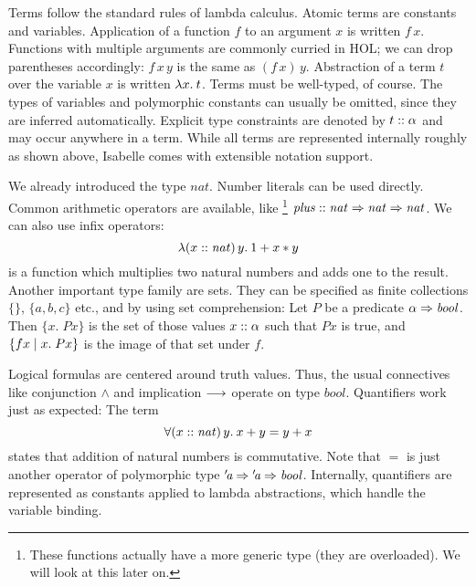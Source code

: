 Terms follow the standard rules of lambda calculus.
Atomic terms are constants and variables.
Application of a function $f$ to an argument $x$ is written $f\,x$.
Functions with multiple arguments are commonly curried in HOL;
we can drop parentheses accordingly: $f\,x\,y$ is the same as $(f\,x)\,y$.
Abstraction of a term $t$ over the variable $x$ is written $\lambda x.\>t$.
Terms must be well-typed, of course.
The types of variables and polymorphic constants can usually be omitted, since
they are inferred automatically.
Explicit type constraints are denoted by $t \mathrel{::} \alpha$ and may occur
anywhere in a term.
While all terms are represented internally roughly as shown above, Isabelle
comes with extensible notation support.

\begin{example}\label{exmp:hol-terms}
We already introduced the type $\mathit{nat}$.
Number literals can be used directly.
Common arithmetic operators are available, like%
\footnote{These functions actually have a more generic type (they are
overloaded). We will look at this later on.}
$\mathit{plus} \mathrel{::} \mathit{nat} \Rightarrow \mathit{nat} \Rightarrow \mathit{nat}$.
We can also use infix operators:
\[ \lambda (x \mathrel{::} \mathit{nat})\,y.\>1 + x * y \]
is a function which multiplies two natural numbers and adds one to the result.
Another important type family are sets.
They can be specified as finite collections $\{\}$, $\{a, b, c\}$ etc., and
by using set comprehension:
Let $P$ be a predicate $\alpha \Rightarrow \mathit{bool}$.
Then $\{x.\; P x\}$ is the set of those values $x \mathrel{::} \alpha$ such that
$P x$ is true, and $\{f x\mid x.\; P x\}$ is the image of that set under $f$.

Logical formulas are centered around truth values.
Thus, the usual connectives like conjunction $\land$ and implication $\longrightarrow$
operate on type $\mathit{bool}$.
Quantifiers work just as expected: The term
\[ \forall (x \mathrel{::} \mathit{nat})\,y.\>x + y = y + x \]
states that addition of natural numbers is commutative.
Note that $=$ is just another operator of polymorphic type
${'\!\textit{a}} \Rightarrow {'\!\textit{a}} \Rightarrow \mathit{bool}$.
Internally, quantifiers are represented as constants applied to lambda
abstractions, which handle the variable binding.
\end{example}

